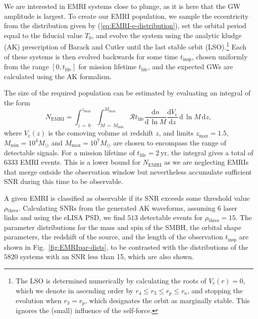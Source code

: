 \documentclass[aps,prd,amsfonts,amssymb,amsmath,nofootinbib,showpacs,superscriptaddress,twocolumn]{revtex4}
\newcommand{\eqnref}[1]{(\ref{eq:#1})}
\newcommand{\figref}[1]{Fig.~\ref{fig:#1}}
\newcommand{\units}[1]{\ensuremath{~\mathrm{#1}}}
\newcommand{\sub}[1]{\ensuremath{_\mathrm{#1}}}
\newcommand{\dd}{\ensuremath{\mathrm{d}}}
\newcommand{\diff}[2]{\ensuremath{\dfrac{\dd {#1}}{\dd {#2}}}}
\newcommand{\intd}[4]{\ensuremath{\int_{#1}^{#2}{#3}\,\dd{#4}}}
\begin{document}
We are interested in EMRI systems close to plunge, as it is here that the GW amplitude is largest. To create our EMRI population, we sample the eccentricity from the distribution given by \eqnref{EMRI-e-distribution}, set the orbital period equal to the fiducial value $T_0$, and evolve the system using the analytic kludge (AK) prescription of Barack and Cutler \cite{Barack2004} until the last stable orbit (LSO).\footnote{The LSO is determined numerically by calculating the roots of $V_r(r)=0$, which we denote in ascending order by $r_4 \leq r_3 \leq r_p \leq r_a$, and stopping the evolution when $r_3 = r_p$, which designates the orbit as marginally stable. This ignores the (small) influence of the self-force.} Each of these systems is then evolved backwards for some time $t\sub{insp}$, chosen uniformly from the range $[0,t\sub{life}]$ for mission lifetime $t\sub{life}$, and the expected GWs are calculated using the AK formalism.

The size of the required population can be estimated by evaluating an integral of the form \citep{Gair2009}
\begin{equation}
\label{eq:EMRI-number}
N\sub{EMRI} = \intd{z\,=\,0}{z\sub{max}}{ \intd{M\,=\,M\sub{min}}{M\sub{max}}{\mathcal{R}t\sub{life}\diff{n}{\,\ln M} \diff{V\sub{c}}{z}}{\,\ln M}}{z},
\end{equation}
where $V\sub{c}(z)$ is the comoving volume at redshift $z$, and limits $z\sub{max} = 1.5$, $M\sub{min} = 10^4 M_\odot$ and $M\sub{max} = 10^7 M_\odot$ are chosen to encompass the range of detectable signals. For a mission lifetime of $t\sub{life} = 2\units{yr}$, the integral gives a total of $6333$ EMRI events. This is a lower bound for $N\sub{EMRI}$ as we are neglecting EMRIs that merge outside the observation window but nevertheless accumulate sufficient SNR during this time to be observable.

A given EMRI is classified as observable if its SNR exceeds some threshold value $\rho\sub{thres}$. Calculating SNRs from the generated AK waveforms, assuming $6$ laser links and using the eLISA PSD, we find $513$ detectable events for $\rho\sub{thres} = 15$. The parameter distributions for the mass and spin of the SMBH, the orbital shape parameters, the redshift of the source, and the length of the observation $t\sub{insp}$ are shown in \figref{EMRIpar-dists}, to be contrasted with the distributions of the $5820$ systems with an SNR less than 15, which are also shown.
\end{document}
